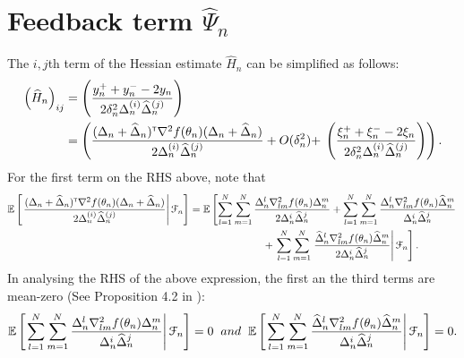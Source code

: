 \section{Feedback term $\widehat \Psi_n$}
The $i,j$th term of the Hessian estimate $\widehat H_n$ can be simplified as follows: 
\begin{align}
\left(\widehat H_n \right)_{ij} & =  \left(\dfrac{y_n^+ + y_n^- - 2 y_n}{2\delta_n^2 \Delta_n^{(i)} \widehat \Delta_n^{(j)}}\right) \nonumber \\
& = \left( \frac{(\Delta_n+ \widehat \Delta_n)^\mathsf{\scriptscriptstyle T} \nabla^2 f(\theta_n) (\Delta_n+ \widehat \Delta_n)}{2\Delta_n^{(i)} \widehat \Delta_n^{(j)}} +  O(\delta_n^2) + \right.\left.\left(\dfrac{\xi_n^+ + \xi_n^- - 2 \xi_n}{2\delta_n^2 \Delta_n^{(i)} \widehat \Delta_n^{(j)}} \right)\right).\label{eq:h3}
\end{align}
For the first term on the RHS above, note that
\begin{align}
\mathbb{E}\left[\left.  \frac{(\Delta_n+ \widehat \Delta_n)^\mathsf{\scriptscriptstyle T} \nabla^2 f(\theta_n) (\Delta_n+ \widehat \Delta_n)}{2\Delta_n^{(i)} \widehat \Delta_n^{(j)}}  \right | \mathcal{F}_n\right] &=\mathbb{E}\left[\sum\limits_{l=1}^N\sum\limits_{m=1}^N \frac{\Delta_n^l \nabla^2_{lm} f(\theta_n) \Delta_n^m}{2\Delta_n^i \widehat\Delta_n^j} + \sum\limits_{l=1}^N\sum\limits_{m=1}^N \frac{\Delta_n^l \nabla^2_{lm} f(\theta_n) \widehat\Delta_n^m}{\Delta_n^i \widehat\Delta_n^j}  \right.\nonumber \\&\hspace{2.5cm}+\left.\sum\limits_{l=1}^N\sum\limits_{m=1}^N \left. \frac{\widehat\Delta_n^l \nabla^2_{lm} f(\theta_n)\widehat \Delta_n^m}{2\Delta_n^i \widehat\Delta_n^j}\right| \mathcal{F}_n\right].\label{eq:2spsaexp}
\end{align}
In analysing the RHS of the above expression, the first an the third terms are mean-zero (See Proposition 4.2 in \cite{bhatnagar2015simultaneous}):
\begin{align}
\mathbb{E}\left[\left.\sum\limits_{l=1}^N\sum\limits_{m=1}^N \frac{\Delta_n^l \nabla^2_{lm} f(\theta_n) \Delta_n^m}{\Delta_n^i \widehat\Delta_n^j} \right | \mathcal{F}_n\right] = 0 \hspace{0.2cm} and \hspace{0.2cm}\mathbb{E}\left[\left.\sum\limits_{l=1}^N\sum\limits_{m=1}^N \frac{\widehat\Delta_n^l \nabla^2_{lm} f(\theta_n) \widehat\Delta_n^m}{\Delta_n^i \widehat\Delta_n^j }\right | \mathcal{F}_n\right] = 0.
\end{align}

